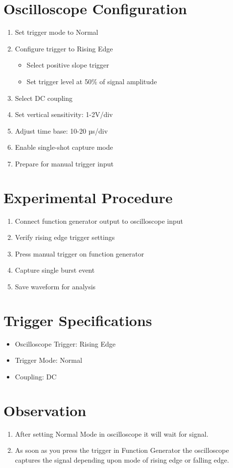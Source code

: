 \documentclass[12pt,a4paper]{report}
\begin{document}
\section*{Oscilloscope Configuration}
\begin{enumerate}[leftmargin=*]
    \item Set trigger mode to Normal
    \item Configure trigger to Rising Edge
    \begin{itemize}[leftmargin=*]
        \item Select positive slope trigger
        \item Set trigger level at 50\% of signal amplitude
    \end{itemize}
    \item Select DC coupling
    \item Set vertical sensitivity: 1-2V/div
    \item Adjust time base: 10-20 µs/div
    \item Enable single-shot capture mode
    \item Prepare for manual trigger input
\end{enumerate}

\section*{Experimental Procedure}
\begin{enumerate}[leftmargin=*]
    \item Connect function generator output to oscilloscope input
    \item Verify rising edge trigger settings
    \item Press manual trigger on function generator
    \item Capture single burst event
    \item Save waveform for analysis
\end{enumerate}

\section*{Trigger Specifications}
\begin{itemize}[leftmargin=*]
    \item Oscilloscope Trigger: Rising Edge
    \item Trigger Mode: Normal
    \item Coupling: DC
\end{itemize}
\section*{Observation}
\begin{enumerate}
    \item After setting Normal Mode in oscilloscope it will wait for signal.
    \item  As soon as you press the trigger in Function Generator the oscilloscope captures the signal depending upon mode of rising edge or falling edge.
\end{enumerate}
\end{document}
